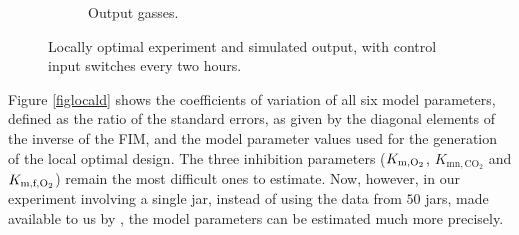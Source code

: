 \begin{figure}[t]
\begin{subfigure}{0.45\textwidth}
		\caption{Output gasses.}
		\label{figlocalc}
	\end{subfigure}
	\caption{Locally optimal experiment and simulated output, with control input switches every two hours.}
	\label{figlocal}
\end{figure}
Figure \ref{figlocald} shows the coefficients of variation of all six model parameters, {\color{red}defined as the ratio of the standard errors, as given by the diagonal elements of the inverse of the FIM, and the model parameter values used for the generation of the local optimal design}. The three inhibition parameters ($K_{\text{m},\text{O}_2}$, $K_{\text{mn},\text{CO}_2}$ and $K_{\text{m,f},\text{O}_2}$) remain the most difficult {\color{red}ones} to estimate. Now, however, in our experiment involving a single jar, instead of using the data from $50$ jars, made available to us by \textcite{ho}, the model parameters can be estimated much more precisely.
